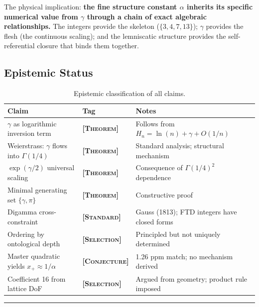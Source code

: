 \documentclass[11pt, letterpaper]{article}
\theoremstyle{definition}
\theoremstyle{remark}
\newcommand{\epi}[1]{\textbf{\textsc{[#1]}}}
\begin{document}
The physical implication: \textbf{the fine structure constant $\alpha$ inherits its specific numerical value from $\gamma$ through a chain of exact algebraic relationships.} The integers provide the skeleton ($\{3, 4, 7, 13\}$); $\gamma$ provides the flesh (the continuous scaling); and the lemniscatic structure provides the self-referential closure that binds them together.

\subsection{Epistemic Status}

\begin{table}[h]
\centering
\small
\begin{tabular}{@{}lll@{}}
\toprule
\textbf{Claim} & \textbf{Tag} & \textbf{Notes} \\
\midrule
$\gamma$ as logarithmic inversion term & \epi{Theorem} & Follows from $H_n = \ln(n) + \gamma + O(1/n)$ \\
Weierstrass: $\gamma$ flows into $\Gamma(1/4)$ & \epi{Theorem} & Standard analysis; structural mechanism \\
$\exp(\gamma/2)$ universal scaling & \epi{Theorem} & Consequence of $\Gamma(1/4)^2$ dependence \\
Minimal generating set $\{\gamma, \pi\}$ & \epi{Theorem} & Constructive proof \\
Digamma cross-constraint & \epi{Standard} & Gauss (1813); FTD integers have closed forms \\
Ordering by ontological depth & \epi{Selection} & Principled but not uniquely determined \\
Master quadratic yields $x_+ \approx 1/\alpha$ & \epi{Conjecture} & 1.26 ppm match; no mechanism derived \\
Coefficient 16 from lattice DoF & \epi{Selection} & Argued from geometry; product rule imposed \\
\bottomrule
\end{tabular}
\caption{Epistemic classification of all claims.}
\end{table}

\vspace{2em}
\hrule
\vspace{1.5em}
\end{document}
